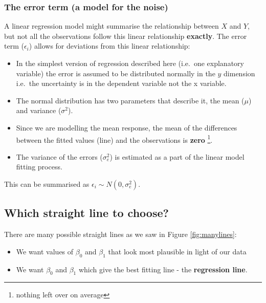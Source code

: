\documentclass[
  oneside]{krantz}
\providecommand{\tightlist}{%
  \setlength{\itemsep}{0pt}\setlength{\parskip}{0pt}}
\begin{document}
\hypertarget{the-error-term-a-model-for-the-noise}{%
\subsubsection{The error term (a model for the noise)}\label{the-error-term-a-model-for-the-noise}}

A linear regression model might summarise the relationship between \(X\) and \(Y\), but not all the observations follow this linear relationship \textbf{exactly}. The error term (\(\epsilon_i\)) allows for deviations from this linear relationship:

\begin{itemize}
\tightlist
\item
  In the simplest version of regression described here (i.e.~one explanatory variable) the error is assumed to be distributed normally in the \(y\) dimension i.e.~the uncertainty is in the dependent variable not the x variable.
\item
  The normal distribution has two parameters that describe it, the mean (\(\mu\)) and variance (\(\sigma^2\)).
\item
  Since we are modelling the mean response, the mean of the differences between the fitted values (line) and the observations is \textbf{zero} \footnote{nothing left over on average}.
\item
  The variance of the errors (\(\sigma_e^2\)) is estimated as a part of the linear model fitting process.
\end{itemize}

This can be summarised as \(\epsilon_i \sim N(0, \sigma_e^2)\).

\hypertarget{which-straight-line-to-choose}{%
\subsection{Which straight line to choose?}\label{which-straight-line-to-choose}}

There are many possible straight lines as we saw in Figure \ref{fig:manylines}:

\begin{itemize}
\item
  We want values of \(\beta_0\) and \(\beta_1\) that look most plausible in light of our data
\item
  We want \(\beta_0\) and \(\beta_1\) which give the best fitting line - the \textbf{regression line}.
\end{itemize}
\end{document}
